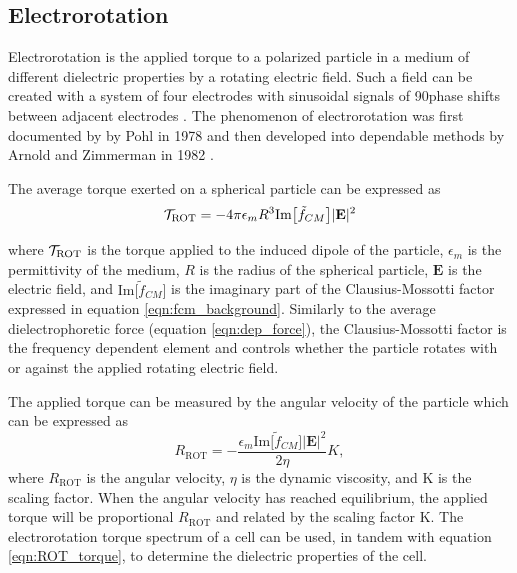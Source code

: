  \subsection{Electrorotation}
 
 \par Electrorotation is the applied torque to a polarized particle in a medium of different dielectric properties by a rotating electric field. Such a field can be created with a system of four electrodes with sinusoidal signals of 90\textdegree \;phase shifts between adjacent electrodes \cite{goater_electrorotation_1999}. The phenomenon of electrorotation was first documented by by Pohl in 1978 and then developed into dependable methods by Arnold and Zimmerman in 1982 \cite{pohl_dielectrophoresis_1978-1, arnold_rotating-field-induced_1982}.
 
 \par The average torque exerted on a spherical particle can be expressed as \cite{morgan_single_2007}
 \begin{equation}
    \mathcal{T}_{\text{ROT}} = -4\pi \epsilon_m R^3 \text{Im}\big[\tilde{f}_{CM}\big]|\textbf{E}|^2
    \label{eqn:ROT_torque}
 \end{equation}
 
 \noindent where $\mathcal{T}_{\text{ROT}}$ is the torque applied to the induced dipole of the particle, $\epsilon_m$ is the permittivity of the medium, $R$ is the radius of the spherical particle, $\textbf{E}$ is the electric field, and $\text{Im}\big[\tilde{f}_{CM}\big]$ is the imaginary part of the Clausius-Mossotti factor expressed in equation \ref{eqn:fcm_background}. Similarly to the average dielectrophoretic force (equation \ref{eqn:dep_force}), the Clausius-Mossotti factor is the frequency dependent element and controls whether the particle rotates with or against the applied rotating electric field.
 
 \par The applied torque can be measured by the angular velocity of the particle which can be expressed as \cite{morgan_ac_2003}
 \begin{equation}
     R_{\text{ROT}} = - \frac{\epsilon_m\text{Im}\big[\tilde{f}_{CM}\big]|\textbf{E}|^2}{2\eta}K, 
 \end{equation}
 \noindent where $R_{\text{ROT}}$ is the angular velocity, $\eta$ is the dynamic viscosity, and K is the scaling factor. When the angular velocity has reached equilibrium, the applied torque will be proportional $R_{\text{ROT}}$ and related by the scaling factor K. The electrorotation torque spectrum of a cell can be used, in tandem with equation \ref{eqn:ROT_torque}, to determine the dielectric properties of the cell. 
 
